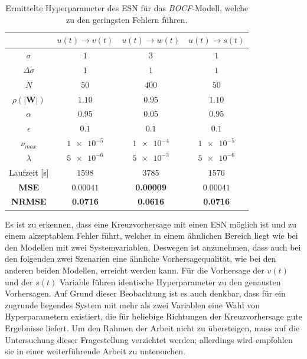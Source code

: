 \begin{table}[H]
	\centering
	\captionsetup{width=0.9\linewidth}
	\begin{tabular}{cccc}
		\hline		
		\multicolumn{1}{c}{} &  $u(t) \rightarrow v(t)$ & $u(t) \rightarrow w(t)$ & $u(t) \rightarrow s(t)$\\ 
		\hline 
		\rule[-1ex]{0pt}{2.5ex} $\sigma$ & $1$ & $3$ & $1$\\ 
		\rule[-1ex]{0pt}{2.5ex} $\Delta \sigma$ & $1$ & $1$ & $1$ \\ 
		\rule[-1ex]{0pt}{3.5ex} $N$ & $50$ & $400$ & $50$ \\ 
		\rule[-1ex]{0pt}{3.5ex} $\rho(|\mathbf{W}|)$ & $1.10$ & $0.95$ & $1.10$\\ 
		\rule[-1ex]{0pt}{3.5ex} $\alpha$ & $0.95$ & $0.05$ & $0.95$ \\ 
		\rule[-1ex]{0pt}{3.5ex} $\epsilon$ & $0.1$ & $0.1$ & $0.1$ \\ 
		\rule[-1ex]{0pt}{3.5ex} $\nu_{max}$ & $\num{1e-5}$ & $\num{1e-4}$ & $\num{1e-5}$\\ 
		\rule[-1ex]{0pt}{3.5ex} $\lambda$ & $\num{5e-6}$ & $\num{5e-3}$ & $\num{5e-6}$\\ 
		\rule[-1ex]{0pt}{2.5ex} Laufzeit [s] & $1598$ & $3785$ & $1576$ \\ 
		\rule[-1ex]{0pt}{2.5ex} \textbf{MSE} & \textbf{$\num{0.00041}$} & \textbf{0.00009} & $0.00041$ \\ 
		\rule[-1ex]{0pt}{2.5ex} \textbf{NRMSE} & \textbf{0.0716} & \textbf{0.0616} & \textbf{0.0716} \\ 
		\hline 
	\end{tabular} 
	\caption{Ermittelte Hyperparameter des \textsc{ESN} für das \textit{BOCF}-Modell, welche zu den geringsten Fehlern führen.}
	\label{tab:exp_cross_bocf_results}
\end{table}

Es ist zu erkennen, dass eine Kreuzvorhersage mit einen \textsc{ESN} möglich ist und zu einem akzeptablem Fehler führt, welcher in einem ähnlichen Bereich liegt wie bei den Modellen mit zwei Systemvariablen. Deswegen ist anzunehmen, dass auch bei den folgenden zwei Szenarien eine ähnliche Vorhersagequalität, wie bei den anderen beiden Modellen, erreicht werden kann. Für die Vorhersage der $v(t)$ und der $s(t)$ Variable führen identische Hyperparameter zu den genausten Vorhersagen. Auf Grund dieser Beobachtung ist es auch denkbar, dass für ein zugrunde liegendes System mit mehr als zwei Variablen eine Wahl von Hyperparametern existiert, die für beliebige Richtungen der Kreuzvorhersage gute Ergebnisse liefert. Um den Rahmen der Arbeit nicht zu übersteigen, muss auf die Untersuchung dieser Fragestellung verzichtet werden; allerdings wird empfohlen sie in einer weiterführende Arbeit zu untersuchen.\\ 


